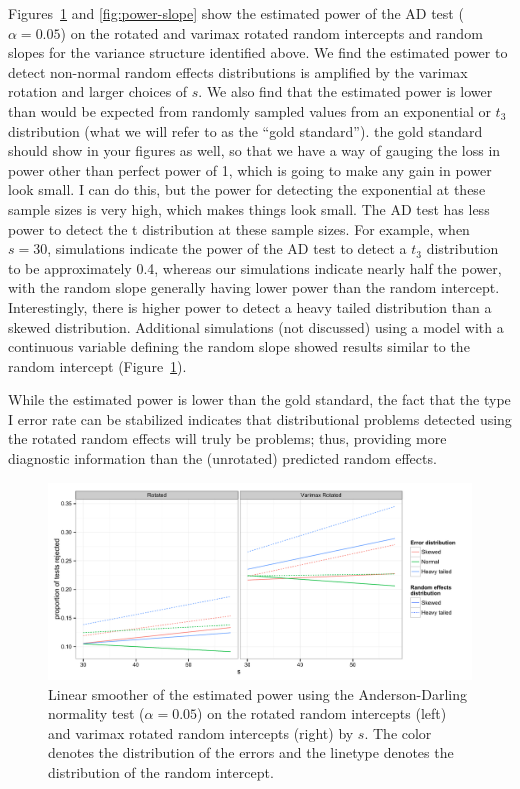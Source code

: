 \documentclass[12pt]{article} %
\newcommand{\hh}[1]{{\color{orange} #1}}
\newcommand{\al}[1]{{\color{red} #1}}
\begin{document}
Figures~\ref{fig:power-int} and \ref{fig:power-slope} show the estimated power of the AD test ($\alpha = 0.05$) on the rotated and varimax rotated random intercepts and random slopes for the variance structure identified above. We find the estimated power to detect non-normal random effects distributions is amplified by the varimax rotation and larger choices of $s$. We also find that the estimated power is lower than would be expected from randomly sampled values from an exponential or $t_3$ distribution (what we will refer to as the ``gold standard''). 
\hh{the gold standard should show in your figures as well, so that we have a way of gauging the loss in power other than perfect power of 1, which is going to make any gain in power look small.} 
\al{I can do this, but the power for detecting the exponential at these sample sizes is very high, which makes things look small. The AD test has less power to detect the t distribution at these sample sizes.}
For example, when $s=30$, simulations indicate the power of the AD test to detect a $t_3$ distribution to be approximately 0.4, whereas our simulations indicate nearly half the power, with the random slope generally having lower power than the random intercept. Interestingly,  there is higher power to detect a heavy tailed distribution than a skewed distribution.  Additional simulations (not discussed) using a model with a continuous variable defining the random slope showed results similar to the random intercept (Figure~\ref{fig:power-int}).

While the estimated power is lower than the gold standard, the fact that the type I error rate can be stabilized indicates that distributional problems detected using the rotated random effects will truly be problems; thus, providing more diagnostic information than the (unrotated) predicted random effects.

\begin{figure}
	\centering
	\includegraphics[width=\textwidth]{ad_intercept_power.pdf}
	\caption{\label{fig:power-int} Linear smoother of the estimated power using the Anderson-Darling normality test ($\alpha = 0.05$) on the rotated random intercepts (left) and varimax rotated random intercepts (right) by $s$. The color denotes the distribution of the errors and the linetype denotes the distribution of the random intercept.}
\end{figure}
\end{document}
